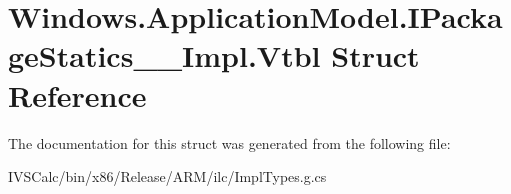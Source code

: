 \hypertarget{struct_windows_1_1_application_model_1_1_i_package_statics_____impl_1_1_vtbl}{}\section{Windows.\+Application\+Model.\+I\+Package\+Statics\+\_\+\+\_\+\+Impl.\+Vtbl Struct Reference}
\label{struct_windows_1_1_application_model_1_1_i_package_statics_____impl_1_1_vtbl}


The documentation for this struct was generated from the following file\+:\begin{DoxyCompactItemize}
\item 
I\+V\+S\+Calc/bin/x86/\+Release/\+A\+R\+M/ilc/Impl\+Types.\+g.\+cs\end{DoxyCompactItemize}
